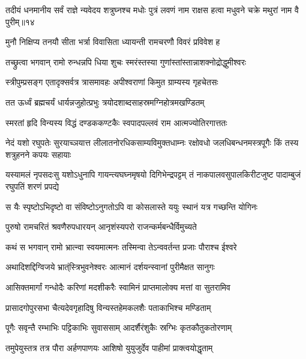 \threelineshloka
{तदीयं धनमानीय सर्वं राज्ञे न्यवेदय}
{शत्रुघ्नश्च मधोः पुत्रं लवणं नाम राक्षस}
{हत्वा मधुवने चक्रे मथुरां नाम वै पुरीम्॥१४} %

\twolineshloka
{मुनौ निक्षिप्य तनयौ सीता भर्त्रा विवासिता}
{ध्यायन्ती रामचरणौ विवरं प्रविवेश ह} %

\twolineshloka
{तच्छ्रुत्वा भगवान् रामो रुन्धन्नपि धिया शुचः}
{स्मरंस्तस्या गुणांस्तांस्तान्नाशक्नोद्रोद्धुमीश्वरः} %

\twolineshloka
{स्त्रीपुम्प्रसङ्ग एतादृक्सर्वत्र त्रासमावहः}
{अपीश्वराणां किमुत ग्राम्यस्य गृहचेतसः} %

\twolineshloka
{तत ऊर्ध्वं ब्रह्मचर्यं धार्यन्नजुहोत्प्रभुः}
{त्रयोदशाब्दसाहस्रमग्निहोत्रमखण्डितम्} %

\twolineshloka
{स्मरतां हृदि विन्यस्य विद्धं दण्डककण्टकैः}
{स्वपादपल्लवं राम आत्मज्योतिरगात्ततः} %

\fourlineindentedshloka
{नेदं यशो रघुपतेः सुरयाच्ञयात्त}
{लीलातनोरधिकसाम्यविमुक्तधाम्नः}
{रक्षोवधो जलधिबन्धनमस्त्रपूगैः}
{किं तस्य शत्रुहनने कपयः सहायाः} %

\fourlineindentedshloka
{यस्यामलं नृपसदःसु यशोऽधुनापि}
{गायन्त्यघघ्नमृषयो दिगिभेन्द्रपट्टम्}
{तं नाकपालवसुपालकिरीटजुष्ट}
{पादाम्बुजं रघुपतिं शरणं प्रपद्ये} %

\twolineshloka
{स यैः स्पृष्टोऽभिदृष्टो वा संविष्टोऽनुगतोऽपि वा}
{कोसलास्ते ययुः स्थानं यत्र गच्छन्ति योगिनः} %

\twolineshloka
{पुरुषो रामचरितं श्रवणैरुपधारयन्}
{आनृशंस्यपरो राजन्कर्मबन्धैर्विमुच्यते} %



\twolineshloka
{कथं स भगवान् रामो भ्रात्न्वा स्वयमात्मनः}
{तस्मिन्वा तेऽन्ववर्तन्त प्रजाः पौराश्च ईश्वरे} %



\twolineshloka
{अथादिशद्दिग्विजये भ्रात्ंस्त्रिभुवनेश्वरः}
{आत्मानं दर्शयन्स्वानां पुरीमैक्षत सानुगः} %

\twolineshloka
{आसिक्तमार्गां गन्धोदैः करिणां मदशीकरैः}
{स्वामिनं प्राप्तमालोक्य मत्तां वा सुतरामिव} %

\twolineshloka
{प्रासादगोपुरसभा चैत्यदेवगृहादिषु}
{विन्यस्तहेमकलशैः पताकाभिश्च मण्डिताम्} %

\twolineshloka
{पूगैः सवृन्तै रम्भाभिः पट्टिकाभिः सुवाससाम्}
{आदर्शैरंशुकैः स्रग्भिः कृतकौतुकतोरणाम्} %

\twolineshloka
{तमुपेयुस्तत्र तत्र पौरा अर्हणपाणयः}
{आशिषो युयुजुर्देव पाहीमां प्राक्त्वयोद्धृताम्} %

